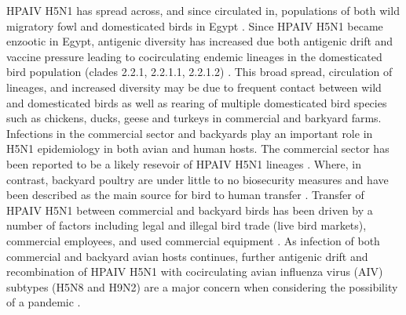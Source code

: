 \documentclass[10pt,english]{article}
\begin{document}
HPAIV H5N1 has spread across, and since circulated in, populations of both wild migratory fowl and domesticated birds in Egypt \autocite{Kayali2014}. Since HPAIV H5N1 became enzootic in Egypt, antigenic diversity has increased due both antigenic drift and vaccine pressure leading to cocirculating endemic lineages in the domesticated bird population (clades 2.2.1, 2.2.1.1, 2.2.1.2) \autocite{Who2012, Kayali2014, Smith2015}. This broad spread, circulation of lineages, and increased diversity may be due to frequent contact between wild and domesticated birds as well as rearing of multiple domesticated bird species such as chickens, ducks, geese and turkeys in commercial and barkyard farms. Infections in the commercial sector and backyards play an important role in H5N1 epidemiology in both avian and human hosts. The commercial sector has been reported to be a likely resevoir of HPAIV H5N1 lineages \autocite{Kayali2011}. Where, in contrast, backyard poultry are under little to no biosecurity measures and have been described as the main source for bird to human transfer \autocite{Kandeel2010}. Transfer of HPAIV H5N1 between commercial and backyard birds has been driven by a number of factors including legal and illegal bird trade (live bird markets), commercial employees, and used commercial equipment \autocite{Abdelwhab2015}. As infection of both commercial and backyard avian hosts continues, further antigenic drift and recombination of HPAIV H5N1 with cocirculating avian influenza virus (AIV) subtypes (H5N8 and H9N2) are a major concern when considering the possibility of a pandemic \autocite{Neumann2012}.
\end{document}

